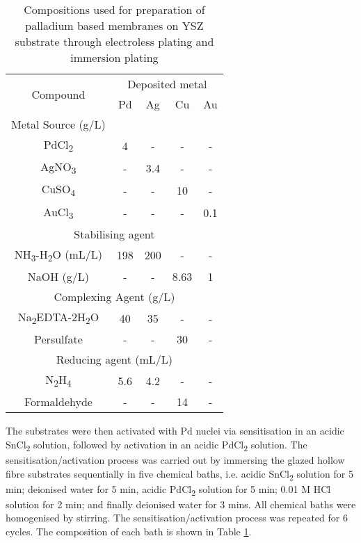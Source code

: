 \begin{table}[]
    \centering
    \caption{Compositions used for preparation of palladium based membranes on YSZ substrate through electroless plating and immersion plating}
    \label{ELP}
    \begin{tabular}{@{}ccccc@{}}
    \toprule
    \multirow{2}{*}{Compound} & \multicolumn{4}{c}{Deposited metal} \\
                              & Pd      & Ag     & Cu      & Au     \\ \midrule
    Metal Source (g/L)        &         &        &         &        \\ \midrule
    PdCl\textsubscript{2}                     & 4       & -      & -       & -      \\
    AgNO\textsubscript{3}                     & -       & 3.4    & -       & -      \\
    CuSO\textsubscript{4}                     & -       & -      & 10      & -      \\
    AuCl\textsubscript{3}                     & -       & -      & -       & 0.1    \\ \midrule
    \multicolumn{5}{c}{Stabilising agent}                           \\ \midrule
    NH\textsubscript{3}-H\textsubscript{2}O (mL/L)            & 198     & 200    & -       & -      \\
    NaOH (g/L)                & -       & -      & 8.63    & 1      \\ \midrule
    \multicolumn{5}{c}{Complexing Agent (g/L)}                      \\ \midrule
    Na\textsubscript{2}EDTA-2H\textsubscript{2}O              & 40      & 35     & -       & -      \\
    Persulfate                & -       & -      & 30      & -      \\ \midrule
    \multicolumn{5}{c}{Reducing agent (mL/L)}                       \\ \midrule
    N\textsubscript{2}H\textsubscript{4}                      & 5.6     & 4.2    & -       & -      \\
    Formaldehyde              & -       & -      & 14      & -      \\ \bottomrule
    \end{tabular}
    \end{table}

The substrates were then activated with Pd nuclei via sensitisation in an acidic SnCl\textsubscript{2} solution, followed by activation in an acidic PdCl\textsubscript{2} solution. The sensitisation/activation 
process was carried out by immersing the glazed hollow fibre substrates sequentially in five chemical baths, i.e. acidic SnCl\textsubscript{2} solution for 5 min; deionised water for 5 min, acidic PdCl\textsubscript{2} solution for 5 min; 0.01 M HCl solution for 2 min; and finally deionised water for 3 mins. 
All chemical baths were homogenised by stirring. The sensitisation/activation process was repeated for 6 cycles. The composition of each bath is shown in Table \ref{ELP}.

